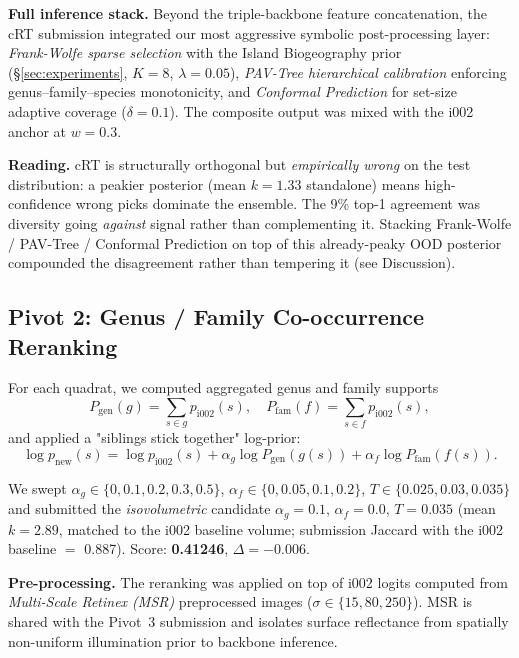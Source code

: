\documentclass[10pt,twocolumn,letterpaper]{article}
\begin{document}
\textbf{Full inference stack.} Beyond the triple-backbone feature concatenation, the cRT submission integrated our most aggressive symbolic post-processing layer: \textit{Frank-Wolfe sparse selection} with the Island Biogeography prior (\S\ref{sec:experiments}, $K{=}8$, $\lambda{=}0.05$), \textit{PAV-Tree hierarchical calibration} enforcing genus--family--species monotonicity, and \textit{Conformal Prediction} for set-size adaptive coverage ($\delta{=}0.1$). The composite output was mixed with the i002 anchor at $w{=}0.3$.

\textbf{Reading.} cRT is structurally orthogonal but \emph{empirically wrong} on the test distribution: a peakier posterior (mean $k\!=\!1.33$ standalone) means high-confidence wrong picks dominate the ensemble. The 9\% top-1 agreement was diversity going \emph{against} signal rather than complementing it. Stacking Frank-Wolfe / PAV-Tree / Conformal Prediction on top of this already-peaky OOD posterior compounded the disagreement rather than tempering it (see Discussion).

\subsection{Pivot 2: Genus / Family Co-occurrence Reranking}

For each quadrat, we computed aggregated genus and family supports
\begin{equation}
P_{\text{gen}}(g) = \!\!\sum_{s\in g}\! p_{\text{i002}}(s),\quad P_{\text{fam}}(f) = \!\!\sum_{s\in f}\! p_{\text{i002}}(s),
\end{equation}
and applied a "siblings stick together" log-prior:
\begin{equation}
\log p_{\text{new}}(s) = \log p_{\text{i002}}(s) + \alpha_g \log P_{\text{gen}}(g(s)) + \alpha_f \log P_{\text{fam}}(f(s)).
\end{equation}

We swept $\alpha_g \in \{0,0.1,0.2,0.3,0.5\}$, $\alpha_f \in \{0,0.05,0.1,0.2\}$, $T \in \{0.025,0.03,0.035\}$ and submitted the \emph{isovolumetric} candidate $\alpha_g{=}0.1$, $\alpha_f{=}0.0$, $T{=}0.035$ (mean $k{=}2.89$, matched to the i002 baseline volume; submission Jaccard with the i002 baseline $=$ 0.887). Score: \textbf{0.41246}, $\Delta = -0.006$.

\textbf{Pre-processing.} The reranking was applied on top of i002 logits computed from \textit{Multi-Scale Retinex (MSR)} preprocessed images ($\sigma \in \{15, 80, 250\}$). MSR is shared with the Pivot~3 submission and isolates surface reflectance from spatially non-uniform illumination prior to backbone inference.
\end{document}
